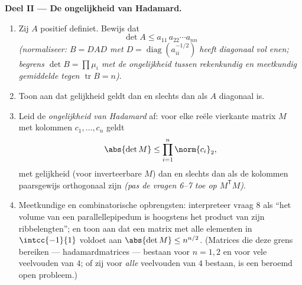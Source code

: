 \begin{problem}
\medskip
\noindent\textbf{Deel II --- De ongelijkheid van Hadamard.}
\begin{enumerate}[resume]
  \item Zij $A$ positief definiet. Bewijs dat
        \[
        \det A \leq a_{11}\,a_{22}\cdots a_{nn}
        \]
        \emph{(normaliseer: $B = DAD$ met $D =
        \operatorname{diag}(a_{ii}^{-1/2})$ heeft diagonaal vol
        enen; begrens $\det B = \prod \mu_i$ met de ongelijkheid
        tussen rekenkundig en meetkundig gemiddelde tegen
        $\operatorname{tr} B = n$)}.
  \item Toon aan dat gelijkheid geldt dan en slechts dan als $A$
        diagonaal is.
  \item Leid de \emph{ongelijkheid van Hadamard} af: voor elke
        reële vierkante matrix $M$ met kolommen $c_1, \dots, c_n$
        geldt
        \[
        \abs{\det M} \leq \prod_{i=1}^{n}\norm{c_i}_2 ,
        \]
        met gelijkheid (voor inverteerbare $M$) dan en slechts dan
        als de kolommen paarsgewijs orthogonaal zijn \emph{(pas de
        vragen 6--7 toe op $M^{\mathsf T}M$)}.
  \item Meetkundige en combinatorische opbrengsten: interpreteer
        vraag 8 als ``het volume van een parallellepipedum is
        hoogstens het product van zijn ribbelengten''; en toon aan
        dat een matrix met alle elementen in $\intcc{-1}{1}$
        voldoet aan $\abs{\det M} \leq n^{n/2}$. (Matrices die deze
        grens bereiken --- hadamardmatrices --- bestaan voor $n =
        1, 2$ en voor vele veelvouden van $4$; of zij voor
        \emph{alle} veelvouden van $4$ bestaan, is een beroemd open
        probleem.)
\end{enumerate}


\end{problem}
